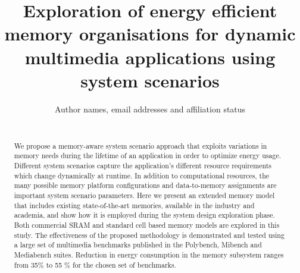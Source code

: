 \documentclass{acm_proc_article-sp}
\begin{document}
\title{Exploration of energy efficient memory organisations for dynamic multimedia applications using system scenarios}


\author{
\alignauthor
Author names, email addresses and affiliation status\\
		\\
}     

\maketitle

\begin{abstract}
We propose a memory-aware system scenario approach that exploits variations in memory needs during the lifetime of an application in order to optimize energy usage. Different system scenarios capture the application's different resource requirements which change dynamically at runtime. In addition to computational resources, the many possible memory platform configurations and data-to-memory assignments are important system scenario parameters. Here we present an extended memory model that includes existing state-of-the-art memories, available in the industry and academia, and show how it is employed during the system design exploration phase. Both commercial SRAM and standard cell based memory models are explored in this study. The effectiveness of the proposed methodology is demonstrated and tested using a large set of multimedia benchmarks published in the Polybench, Mibench and Mediabench suites. Reduction in energy consumption in the memory subsystem ranges from 35\% to 55 \% for the chosen set of benchmarks.
\end{abstract}
\end{document}
